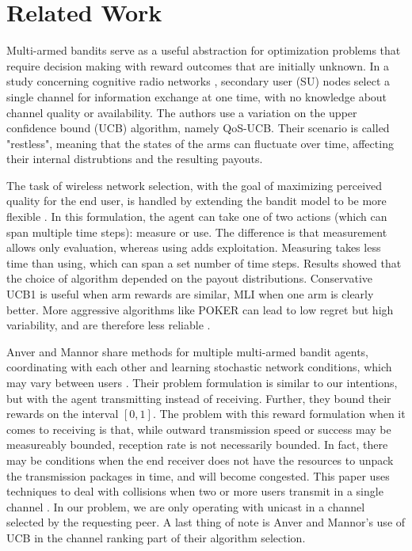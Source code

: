 \documentclass{article}
\begin{document}
\section{Related Work}

Multi-armed bandits serve as a useful abstraction for optimization problems that require decision making with reward outcomes that are initially unknown. In a study 
concerning cognitive radio networks \cite{qos_selection_mab}, secondary user (SU) nodes select a single channel for information exchange at one time, with no knowledge 
about channel quality or availability. The authors use a variation on the upper confidence bound (UCB) algorithm, namely QoS-UCB. Their scenario is called "restless", 
meaning that the states of the arms can fluctuate over time, affecting their internal distrubtions and the resulting payouts.

The task of wireless network selection, with the goal of maximizing perceived quality for the end user, is handled by extending the bandit model to be more flexible 
\cite{muMAB_wireless}. In this formulation, the agent can take one of two actions (which can span multiple time steps): measure or use. The difference is that 
measurement allows only evaluation, whereas using adds exploitation. Measuring takes less time than using, which can span a set number of time steps. Results showed 
that the choice of algorithm depended on the payout distributions. Conservative UCB1 is useful when arm rewards are similar, MLI when one arm is clearly better. 
More aggressive algorithms like POKER can lead to low regret but high variability, and are therefore less reliable \cite{muMAB_wireless}.

Anver and Mannor share methods for multiple multi-armed bandit agents, coordinating with each other and learning stochastic network conditions, which may vary between 
users \cite{multiuser_mab}. Their problem formulation is similar to our intentions, but with the agent transmitting instead of receiving. Further, they bound their rewards 
on the interval $[0,1]$. The problem with this reward formulation when it comes to receiving is that, while outward transmission speed or success may be measureably bounded, 
reception rate is not necessarily bounded. In fact, there may be conditions when the end receiver does not have the resources to unpack the transmission packages in time, 
and will become congested. This paper uses techniques to deal with collisions when two or more users transmit in a single channel \cite{multiuser_mab}. In our problem, we 
are only operating with unicast in a channel selected by the requesting peer. A last thing of note is Anver and Mannor's use of UCB in the channel ranking part of their 
algorithm selection.
\end{document}
